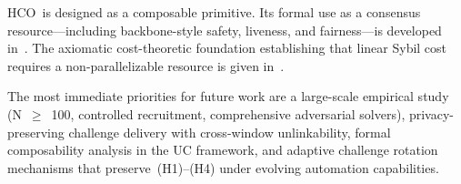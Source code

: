 \documentclass[11pt]{article}
\newcommand{\HCO}{HCO\xspace}
\theoremstyle{remark}
\theoremstyle{plain}
\begin{document}
	\HCO\ is designed as a composable primitive. Its formal use as a
	consensus resource---including backbone-style safety, liveness, and
	fairness---is developed in~\cite{maleki2026pocmt}. The axiomatic
	cost-theoretic foundation establishing that linear Sybil cost requires
	a non-parallelizable resource is given in~\cite{maleki2026geometry}.
	
	The most immediate priorities for future work are a large-scale empirical
	study (N~$\geq$~100, controlled recruitment, comprehensive adversarial
	solvers), privacy-preserving challenge delivery with cross-window
	unlinkability, formal composability analysis in the UC framework, and
	adaptive challenge rotation mechanisms that preserve~(H1)--(H4) under
	evolving automation capabilities.
	
	
	
	
	
	
\end{document}
